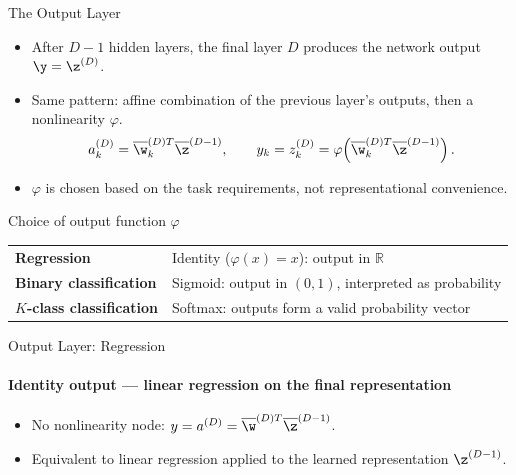 \begin{frame}{The Output Layer}
  \begin{itemize}
    \item After $D-1$ hidden layers, the final layer $D$ produces the network output $\y = \z^{(D)}$.
    \item Same pattern: affine combination of the previous layer's outputs, then a nonlinearity $\varphi$.
    \[
      a_k^{(D)} = \overline{\w}_k^{(D)T}\overline{\z}^{(D-1)}, \qquad
      y_k = z_k^{(D)} = \varphi\!\left(\overline{\w}_k^{(D)T}\overline{\z}^{(D-1)}\right).
    \]
    \item $\varphi$ is chosen based on the \alert{task requirements}, not representational convenience.
  \end{itemize}
  \begin{block}{Choice of output function $\varphi$}
    \begin{tabular}{ll}
      \textbf{Regression} & Identity ($\varphi(x)=x$): output in $\mathbb{R}$ \\
      \textbf{Binary classification} & Sigmoid: output in $(0,1)$, interpreted as probability \\
      \textbf{$K$-class classification} & Softmax: outputs form a valid probability vector
    \end{tabular}
  \end{block}
\end{frame}

\begin{frame}{Output Layer: Regression}
  \framesubtitle{Identity output — linear regression on the final representation}
  \begin{center}
  \end{center}
  \begin{itemize}
    \item No nonlinearity node: $y = a^{(D)} = \overline{\w}^{(D)T}\overline{\z}^{(D-1)}$.
    \item Equivalent to linear regression \alert{applied to the learned representation} $\z^{(D-1)}$.
  \end{itemize}
\end{frame}

